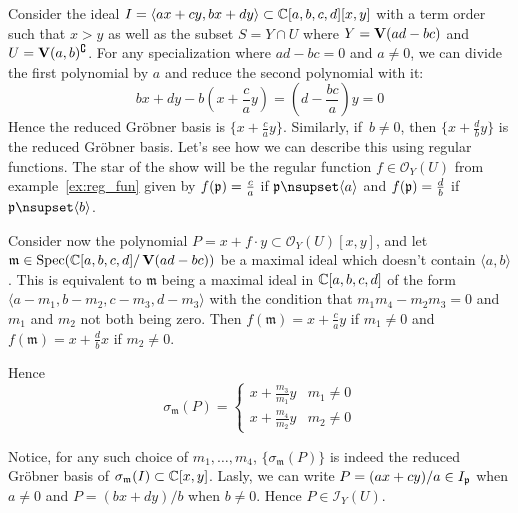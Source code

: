 \begin{example}\upshape
  Consider the ideal $I = \langle ax + cy, bx + dy \rangle \subset \mathbb{C}[a, b, c, d][x, y]$ with a term order such that $x > y$ as well as the subset $S = Y \cap U$ where $Y = \operatorname{\mathbf V}(ad - bc)$ and $U = \operatorname{\mathbf V}(a, b)^{\complement}$. For any specialization where $ad - bc = 0$ and $a \neq 0$, we can divide the first polynomial by $a$ and reduce the second polynomial with it:
  \[bx + dy - b\left(x + \frac c a y\right) = \left(d - \frac{bc}{a}\right)y = 0\]
  Hence the reduced Gröbner basis is $\{x + \frac c a y\}$. Similarly, if $\,b \neq 0$, then $\{x + \frac d b y\}$ is the reduced Gröbner basis. Let's see how we can describe this using regular functions. The star of the show will be the regular function $f \in \mathcal O_{Y}(U)$ from example~\ref{ex:reg_fun} given by $f(\mathfrak p) = \frac c a$ if $\p \nsupset \langle a \rangle$ and $f(\mathfrak p) = \frac d b$ if $\p \nsupset \langle b \rangle$.

  Consider now the polynomial $P = x + f \cdot y \subset \mathcal O_{Y}(U)[x, y]$, and let $\mathfrak m \in \operatorname{Spec}(\mathbb{C}[a, b, c, d]/\operatorname{\mathbf V}(ad - bc))$ be a maximal ideal which doesn't contain $\langle a, b \rangle$. This is equivalent to $\mathfrak m$ being a maximal ideal in $\mathbb{C}[a, b, c, d]$ of the form $\langle a - m_{1}, b - m_{2}, c - m_{3}, d - m_{3} \rangle$ with the condition that $m_{1} m_{4} - m_{2} m_{3} = 0$ and $m_{1}$ and $m_{2}$ not both being zero. Then $f(\mathfrak m) = x + \frac c a y$ if $m_{1} \neq 0$ and $f(\mathfrak m) = x + \frac d b x$ if $m_{2} \neq 0$.

  Hence \[\sigma_{\mathfrak m}(P) =
    \begin{cases}
      x + \frac{m_{3}}{m_{1}}y & m_{1} \neq 0 \\
      x + \frac{m_{4}}{m_{2}}y & m_{2} \neq 0
    \end{cases}
  \]

  Notice, for any such choice of $m_{1}, \dots, m_{4}$, $\{\sigma_{\mathfrak m}(P)\}$ is indeed the reduced Gröbner basis of $\sigma_{\mathfrak m}(I) \subset \mathbb{C}[x, y]$. Lasly, we can write $P = (ax + cy)/a \in I_{\mathfrak p}$ when $a \neq 0$ and $P = (bx + dy)/b$ when $b \neq 0$. Hence $P \in \mathcal I_{Y}(U)$.
\end{example}





















